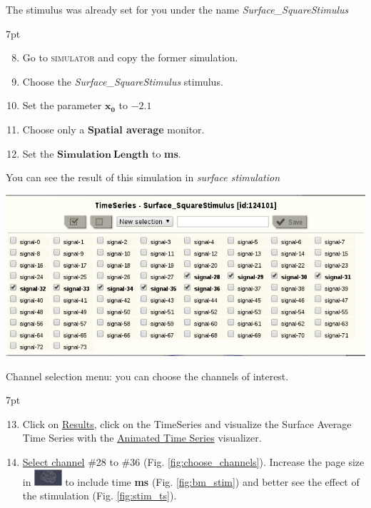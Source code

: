 \documentclass{tufte-handout}
\newenvironment{simulation}{%
  \def\FrameCommand{%
    \hspace{1pt}%
    {\color{ForestGreen}\vrule width 2pt}%
    {\color{simulationshade}\vrule width 4pt}%
    \colorbox{simulationshade}%
  }%
  \MakeFramed{\advance\hsize-\width\FrameRestore}%
  \noindent\hspace{-4.55pt}%
  \begin{adjustwidth}{}{7pt}%
  \vspace{2pt}\vspace{2pt}%
}
{%
  \vspace{2pt}\end{adjustwidth}\endMakeFramed%
}
\begin{document}
The stimulus was already set for you under the name \textit{Surface\_SquareStimulus}

  \begin{simulation}
  \begin{enumerate}
  \setcounter{enumi}{7}
  \item Go to \textsc{simulator} and copy the former simulation.
  \item Choose the \textit{Surface\_SquareStimulus} stimulus.
  \item Set the parameter $\mathbf{x_0}$ to $\mathbf{-2.1}$
  \item Choose only a \textbf{Spatial average} monitor.
  \item Set the $\mathbf{Simulation\:Length}$ to \textbf{\unit[4000]{ms}}.
 
\end{enumerate}
\end{simulation}


You can see the result of this simulation in \textit{surface stimulation}

\begin{marginfigure}
  \includegraphics[width=\linewidth]{Handout_UI_ModellingAnEpilepticPatient_ChooseChannelsStimulation}%
  \caption{Channel selection menu: you can choose the channels of interest. }%
  \label{fig:choose_channels}%
\end{marginfigure}


  \begin{simulation}
  \begin{enumerate}
  \setcounter{enumi}{12}
  \item Click on \underline{Results}, click on the TimeSeries and visualize the Surface Average Time Series with 
  the \underline{Animated Time Series} visualizer.
  \item \underline{Select channel} \#28 to \#36 (Fig. \ref{fig:choose_channels}). Increase the page size in \includegraphics[width=0.08\textwidth]{butt_brain_menu} to include time \textbf{\unit[2000]{ms}}
  (Fig. \ref{fig:bm_stim}) and better see the effect of the stimulation (Fig. \ref{fig:stim_ts}).
 
\end{enumerate}
\end{simulation}
\end{document}
